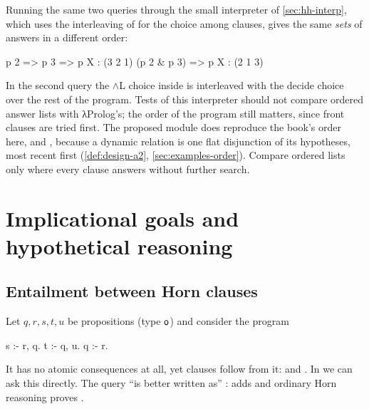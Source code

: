 {\begin{kanren}
Running the same two queries through the small interpreter of \cref{sec:hh-interp}, which uses the
interleaving  of \micro{} for the choice among clauses, gives the same \emph{sets} of answers
in a different order:
\begin{answers}
p 2 => p 3 => p X    : (3 2 1)
(p 2 & p 3) => p X   : (2 1 3)
\end{answers}
In the second query the $\wedge$L choice inside  is interleaved with the decide choice
over the rest of the program. Tests of this interpreter should not compare ordered answer lists with
λProlog's; the order of the program still matters, since front clauses are tried first. The proposed
module does reproduce the book's order here,  and , because a dynamic relation
is one flat disjunction of its hypotheses, most recent first (\cref{def:design-a2},
\cref{sec:examples-order}). Compare ordered lists only where every clause answers without further search.
\end{kanren}

\section{Implicational goals and hypothetical reasoning}\label{sec:hh-augment}

\subsection{Entailment between Horn clauses}\label{sec:hh-entail}

Let $q,r,s,t,u$ be propositions (type $\mathsf{o}$) and consider the program 
\begin{lprolog}
s :- r, q.
t :- q, u.
q :- r.
\end{lprolog}
It has no atomic consequences at all, yet clauses follow from it:  and 
. In \fohh{} we can ask this directly. The query  ``is better written as''
 :  adds  and ordinary Horn reasoning proves .

}
